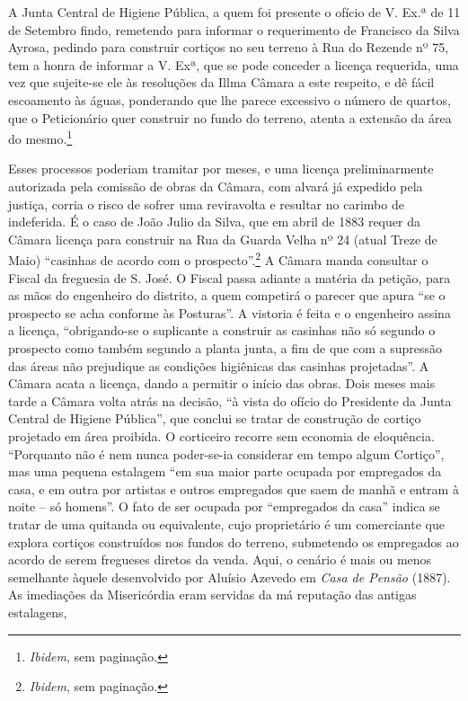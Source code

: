 A Junta Central de Higiene Pública, a quem foi presente o ofício de V.
Ex.ª de 11 de Setembro findo, remetendo para informar o requerimento de
Francisco da Silva Ayrosa, pedindo para construir cortiços no seu
terreno à Rua do Rezende nº 75, tem a honra de informar a V. Exª, que se
pode conceder a licença requerida, uma vez que sujeite-se ele às
resoluções da Illma Câmara a este respeito, e dê fácil escoamento às
águas, ponderando que lhe parece excessivo o número de quartos, que o
Peticionário quer construir no fundo do terreno, atenta a extensão da
área do mesmo.\footnote{\emph{Ibidem}, sem paginação.}

Esses processos poderiam tramitar por meses, e uma licença
preliminarmente autorizada pela comissão de obras da Câmara, com alvará
já expedido pela justiça, corria o risco de sofrer uma reviravolta e
resultar no carimbo de indeferida. É o caso de João Julio da Silva, que
em abril de 1883 requer da Câmara licença para construir na Rua da
Guarda Velha nº 24 (atual Treze de Maio) ``casinhas de acordo com o
prospecto''.\footnote{\emph{Ibidem}, sem paginação.} A Câmara manda
consultar o Fiscal da freguesia de S. José. O Fiscal passa adiante a
matéria da petição, para as mãos do engenheiro do distrito, a quem
competirá o parecer que apura ``se o prospecto se acha conforme às
Posturas''. A vistoria é feita e o engenheiro assina a licença,
``obrigando-se o suplicante a construir as casinhas não só segundo o
prospecto como também segundo a planta junta, a fim de que com a
supressão das áreas não prejudique as condições higiênicas das casinhas
projetadas''. A Câmara acata a licença, dando a permitir o início das
obras. Dois meses mais tarde a Câmara volta atrás na decisão, ``à vista
do ofício do Presidente da Junta Central de Higiene Pública'', que
conclui se tratar de construção de cortiço projetado em área proibida. O
corticeiro recorre sem economia de eloquência. ``Porquanto não é nem
nunca poder-se-ia considerar em tempo algum Cortiço'', mas uma pequena
estalagem ``em sua maior parte ocupada por empregados da casa, e em
outra por artistas e outros empregados que saem de manhã e entram à
noite -- só homens''. O fato de ser ocupada por ``empregados da casa''
indica se tratar de uma quitanda ou equivalente, cujo proprietário é um
comerciante que explora cortiços construídos nos fundos do terreno,
submetendo os empregados ao acordo de serem fregueses diretos da venda.
Aqui, o cenário é mais ou menos semelhante àquele desenvolvido por
Aluísio Azevedo em \emph{Casa de Pensão} (1887). As imediações da
Misericórdia eram servidas da má reputação das antigas estalagens,
